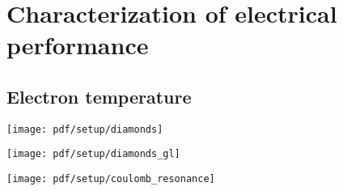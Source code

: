 \chapter{Characterization of electrical performance}\label{ch:setup:electrical}

\section{Electron temperature}\label{sec:setup:electrical:etemp}
\begin{figure*}
    \centering
    \texttt{[image: pdf/setup/diamonds]}
    \caption{}
    \label{fig:}
\end{figure*}

\begin{marginfigure}
    \centering
    \texttt{[image: pdf/setup/diamonds\_gl]}
    \caption{}
    \label{fig:}
\end{marginfigure}

\begin{marginfigure}
    \centering
    \texttt{[image: pdf/setup/coulomb\_resonance]}
    \caption{}
    \label{fig:}
\end{marginfigure}
